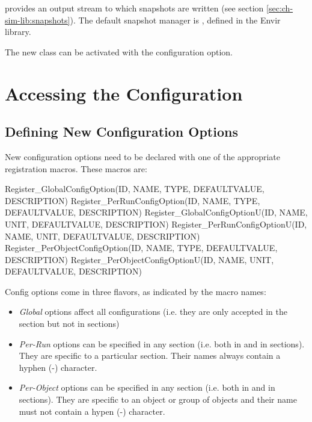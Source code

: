  provides an output stream to which snapshots are written
(see section \ref{sec:ch-sim-lib:snapshots}). The default snapshot manager
is , defined in the Envir library.

The new class can be activated with the 
configuration option.


\section{Accessing the Configuration}
\label{sec:plugin-exts:accessing-config}

\subsection{Defining New Configuration Options}

New configuration options need to be declared with one of the appropriate
registration macros. These macros are:

\begin{cpp}
Register_GlobalConfigOption(ID, NAME, TYPE, DEFAULTVALUE, DESCRIPTION)
Register_PerRunConfigOption(ID, NAME, TYPE, DEFAULTVALUE, DESCRIPTION)
Register_GlobalConfigOptionU(ID, NAME, UNIT, DEFAULTVALUE, DESCRIPTION)
Register_PerRunConfigOptionU(ID, NAME, UNIT, DEFAULTVALUE, DESCRIPTION)
Register_PerObjectConfigOption(ID, NAME, TYPE, DEFAULTVALUE, DESCRIPTION)
Register_PerObjectConfigOptionU(ID, NAME, UNIT, DEFAULTVALUE, DESCRIPTION)
\end{cpp}

Config options come in three flavors, as indicated by the macro names:

\begin{itemize}
  \item \textit{Global} options affect all configurations (i.e. they are
      only accepted in the \ttt{[General]} section but not in
       sections)
  \item \textit{Per-Run} options can be specified in any section
      (i.e. both in \ttt{[General]} and in  sections).
      They are specific to a particular section. Their names always contain
      a hyphen (-) character.
  \item \textit{Per-Object} options can be specified in any section
      (i.e. both in \ttt{[General]} and in  sections).
      They are specific to an object or group of objects and their name must
      not contain a hypen (-) character.
\end{itemize}

